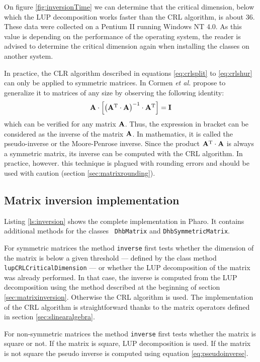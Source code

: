\documentclass[twoside]{book}
\begin{document}
On figure \ref{fig:inversionTime} we can determine that the
critical dimension, below which the LUP decomposition works faster
than the CRL algorithm, is about 36. These data were collected on
a Pentium II running Windows NT 4.0. As this value is depending on
the performance of the operating system, the reader is advised to
determine the critical dimension again when installing the classes
on another system.

In practice, the CLR algorithm described in equations
\ref{eq:crlsplit} to \ref{eq:crlshur} can only be applied to
symmetric matrices. In \cite{CorLeiRiv} Cormen {\it et al.}
propose to generalize it to matrices of any size by observing the
following identity:
\begin{equation}
\label{eq:pseudoinverse}
  {\bf A}\cdot\left[\left({\bf A}^{\mathop{\rm T}}\cdot{\bf A}\right)^{-1}\cdot{\bf A}^{\mathop{\rm T}}\right]={\bf I}
\end{equation}
which can be verified for any matrix ${\bf A}$. Thus, the
expression in bracket can be considered as the inverse of the
matrix ${\bf A}$. In mathematics, it is called the pseudo-inverse
or the Moore-Penrose inverse. Since the product
${\bf A}^{\mathop{\rm T}}\cdot{\bf A}$ is always a symmetric matrix, its
inverse can be computed with the CRL algorithm. In practice,
however. this technique is plagued with rounding errors and should
be used with caution (\cf section \ref{sec:matrixrounding}).

\subsection{Matrix inversion implementation}
Listing \ref{ls:inversion} shows the complete implementation in
Pharo. It contains additional methods for the classes {\tt
DhbMatrix} and {\tt DhbSymmetricMatrix}.

For symmetric matrices the method {\tt inverse} first tests
whether the dimension of the matrix is below a given threshold ---
defined by the class method {\tt lupCRLCriticalDimension} --- or
whether the LUP decomposition of the matrix was already performed.
In that case, the inverse is computed from the LUP decomposition
using the method described at the beginning of section
\ref{sec:matrixinversion}. Otherwise the CRL algorithm is used.
The implementation of the CRL algorithm is straightforward thanks
to the matrix operators defined in section
\ref{sec:slinearalgebra}.

For non-symmetric matrices the method {\tt inverse} first tests
whether the matrix is square or not. If the matrix is square, LUP
decomposition is used. If the matrix is not square the pseudo
inverse is computed using equation \ref{eq:pseudoinverse}.
\end{document}
